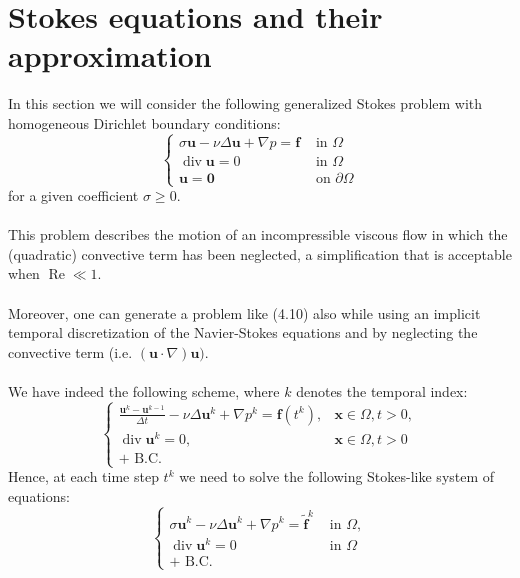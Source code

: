 \documentclass[11pt]{book}
\begin{document}
\section{Stokes equations and their approximation}
In this section we will consider the following generalized Stokes problem with homogeneous Dirichlet boundary conditions:
\begin{equation}
\begin{cases}\sigma \mathbf{u}-\nu \Delta \mathbf{u}+\nabla p=\mathbf{f} & \text { in } \Omega \\ \operatorname{div} \mathbf{u}=0 & \text { in } \Omega \\ \mathbf{u}=\mathbf{0} & \text { on } \partial \Omega\end{cases}
\end{equation}
for a given coefficient $\sigma \geq 0$.\\ \\
This problem describes the motion of an incompressible viscous flow in which the (quadratic) convective term has been neglected, a simplification that is acceptable when $\operatorname{Re} \ll 1$.\\ \\
Moreover, one can generate a problem like (4.10) also while using an implicit temporal discretization of the Navier-Stokes equations and by neglecting the convective term (i.e. $(\mathbf{u} \cdot \nabla) \mathbf{u})$.\\ \\
We have indeed the following scheme, where $k$ denotes the temporal index:
$$
\begin{cases}\frac{\mathbf{u}^{k}-\mathbf{u}^{k-1}}{\Delta t}-\nu \Delta \mathbf{u}^{k}+\nabla p^{k}=\mathbf{f}\left(t^{k}\right), & \mathbf{x} \in \Omega, t>0, \\ \operatorname{div} \mathbf{u}^{k}=0, & \mathbf{x} \in \Omega, t>0 \\ + \text { B.C. } & \end{cases}
$$
Hence, at each time step $t^{k}$ we need to solve the following Stokes-like system of equations:
\begin{equation}
\begin{cases}\sigma \mathbf{u}^{k}-\nu \Delta \mathbf{u}^{k}+\nabla p^{k}=\tilde{\mathbf{f}}^{k} & \text { in } \Omega, \\ \operatorname{div} \mathbf{u}^{k}=0 & \text { in } \Omega \\ + \text { B.C. } & \end{cases}
\end{equation}
\end{document}
